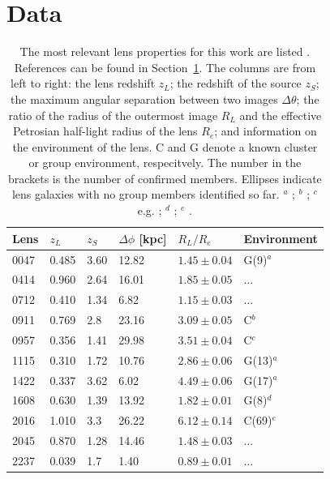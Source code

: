 \documentclass[useAMS,usenatbib]{mn2e}
\begin{document}
\section{Data}\label{sec:data}
\setlength\tabcolsep{5pt}
\begin{table}
  \begin{center}
    \begin{tabular}{l l l l l l}
      Lens & $z_{L}$ & $z_{S}$ & $\Delta\phi$ [kpc] & $R_{L}/R_{e}$ & Environment \\ \hline
      0047 & 0.485 & 3.60 & 12.82 & $1.45\pm0.04$ & G(9)$^{a}$ \\
      0414 & 0.960 & 2.64 & 16.01 & $1.85\pm0.05$ & ... \\
      0712 & 0.410 & 1.34 & 6.82  & $1.15\pm0.03$ & ... \\
      0911 & 0.769 & 2.8  & 23.16 & $3.09\pm0.05$ & C$^{b}$ \\
      0957 & 0.356 & 1.41 & 29.98 & $3.51\pm0.04$ & C$^{c}$ \\
      1115 & 0.310 & 1.72 & 10.76 & $2.86\pm0.06$ & G(13)$^{a}$ \\
      1422 & 0.337 & 3.62 & 6.02  & $4.49\pm0.06$ & G(17)$^{a}$ \\
      1608 & 0.630 & 1.39 & 13.92 & $1.82\pm0.01$ & G(8)$^{d}$ \\
      2016 & 1.010 & 3.3  & 26.22 & $6.12\pm0.14$ & C(69)$^{e}$ \\
      2045 & 0.870 & 1.28 & 14.46 & $1.48\pm0.03$ & ... \\
      2237 & 0.039 & 1.7  & 1.40  & $0.89\pm0.01$ & ... \\
    \end{tabular}
    \caption[width=\linewidth]{The most relevant lens properties for this work are listed \citep[for an expanded version of this table see][]{2011ApJ...740...97L}. References can be found in Section~\ref{sec:data}. The columns are from left to right: the lens redshift $z_L$; the redshift of the source $z_S$; the maximum angular separation between two images $\Delta\theta$; the ratio of the radius of the outermost image $R_L$ and the effective Petrosian half-light radius of the lens $R_e$; and information on the environment of the lens. C and G denote a known cluster or group environment, respecitvely. The number in the brackets is the number of confirmed members. Ellipses indicate lens galaxies with no group members identified so far. \newline $^{a}$ \citet{2011ApJ...726...84W}; $^{b}$ \citet{2001ApJ...555....1M}; $^{c}$ e.g. \citet{1992MNRAS.254P..27G}; $^{d}$ \citet{2006ApJ...642...30F}; $^{e}$ \citet{2003MNRAS.344..337T}.}
    \label{tab:lensproperties}
  \end{center}
\end{table}
\setlength\tabcolsep{6pt}
\end{document}

